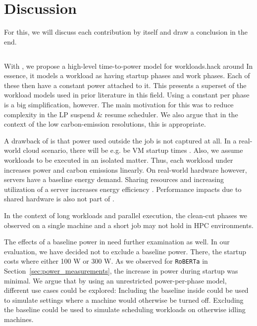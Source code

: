 \chapter{Discussion} \label{sec:discussion}

For this, we will discuss each contribution by itself and draw a conclusion in the end.

\section{\modelname{}}

With \modelname{}, we propose a high-level time-to-power model for workloads.hack around
In essence, it models a workload as having startup phases and work phases. 
Each of these then have a constant power attached to it. 
This presents a superset of the workload models used in prior literature in this field.
Using a constant per phase is a big simplification, however. 
The main motivation for this was to reduce complexity in the LP suspend \& resume scheduler.
We also argue that in the context of the low carbon-emission resolutions, this is appropriate.

A drawback of \modelname{} is that power used outside the job is not captured at all.
In a real-world cloud scenario, there will be e.g. be VM startup times \cite{zheng_benchmarking_2019}.
Also, we assume workloads to be executed in an isolated matter. 
Thus, each workload under \modelname{} increases power and carbon emissions linearly.
On real-world hardware however, servers have a baseline energy demand. 
Sharing resources and increasing utilization of a server increases energy efficiency \cite{barroso_case_2007}. 
Performance impacts due to shared hardware is also not part of \modelname{}.

In the context of long workloads and parallel execution, the clean-cut phases we observed on a single machine and a short job may 
not hold in HPC environments.

The effects of a baseline power in \modelname{} need further examination as well.
In our evaluation, we have decided not to exclude a baseline power. There, the startup costs where either 100 W or 300 W. As we observed for \verb|RoBERTa| in Section~\ref{sec:power_measurements}, the increase in power during startup was minimal. 
We argue that by using an unrestricted power-per-phase model, different use cases could be explored:
Including the baseline inside \modelname{} could be used to simulate settings where a machine would otherwise be turned off. 
Excluding the baseline could be used to simulate scheduling workloads on otherwise idling machines.


